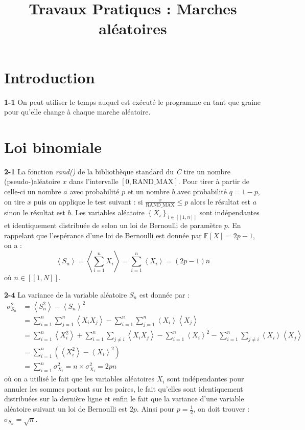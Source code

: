 \documentclass[a4paper,10pt]{article}
\title{Travaux Pratiques : Marches aléatoires}
\author{}
\begin{document}
\maketitle

\section{Introduction}

\textbf{1-1} On peut utiliser le temps auquel est exécuté le programme en tant que graine pour qu'elle change à chaque marche aléatoire.

\section{Loi binomiale}

\textbf{2-1} La fonction \textit{rand()} de la bibliothèque standard du \textit{C} tire un nombre (pseudo-)aléatoire $x$ dans l'intervalle $\left[0, \text{RAND\_MAX}\right]$. Pour tirer à partir de celle-ci un nombre $a$ avec probabilité $p$ et un nombre $b$ avec probabilité $q = 1-p$, on tire $x$ puis on applique le test suivant : si $\frac{x}{\text{RAND\_MAX}} \leq p$ alors le résultat est $a$ sinon le résultat est $b$.
Les variables aléatoire $\left\{X_i\right\}_{i \in [\![1, n]\!]}$ sont indépendantes et identiquement distribuée de selon un loi de Bernoulli de paramètre $p$. En rappelant que l'espérance d'une loi de Bernoulli est donnée par $\mathbb{E}\left[X\right] = 2p-1$, on a :
\begin{equation}
	\left<S_n\right> = \left<\sum\limits_{i=1}^n X_i\right>
                     = \sum\limits_{i=1}^n \left<X_i\right>
                     = \left(2p-1\right)n
\end{equation}
où $n \in [\![1, N]\!]$.

\textbf{2-4} La variance de la variable aléatoire $S_n$ est donnée par :
\begin{align*}
	\sigma_{S_n}^2 &= \left<S_n^2\right> - \left<S_n\right>^2 \\
	               &= \sum\limits_{i=1}^{n}\sum\limits_{j=1}^{n}\left<X_iX_j
	               \right> - \sum\limits_{i=1}^{n}\sum\limits_{j=1}^{n} \left<X_i\right>\left<X_j\right>\\
	               &= \sum\limits_{i=1}^{n}\left<X_i^2\right>
	               + \sum\limits_{i=1}^{n}\sum\limits_{j\neq i}
	               \left<X_iX_j\right> -
	               \sum\limits_{i=1}^{n}\left<X_i\right>^2
	               - \sum\limits_{i=1}^{n}\sum\limits_{j\neq i}
	               \left<X_i\right>\left<X_j\right>\\
	               &= \sum\limits_{i=1}^{n}\left(\left<X_i^2\right> -
	               \left<X_i\right>^2\right)\\
	               &= \sum\limits_{i=1}^{n} \sigma_{X_i}^2 = n\times\sigma_{X_i}^2 = 2pn
\end{align*}
où on a utilisé le fait que les variables aléatoires $X_i$ sont indépendantes pour annuler les sommes portant sur les paires, le fait qu'elles sont identiquement distribuées sur la dernière ligne et enfin le fait que la variance d'une variable aléatoire suivant un loi de Bernoulli est $2p$.
Ainsi pour $p=\frac{1}{2}$, on doit trouver : $\sigma_{S_n} = \sqrt{n}$.
\end{document}
